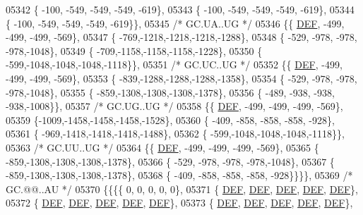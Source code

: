 \begin{DoxyCode}
05342 \{ -100, -549, -549, -549, -619\},
05343 \{ -100, -549, -549, -549, -619\},
05344 \{ -100, -549, -549, -549, -619\}\},
05345 \textcolor{comment}{/* GC.UA..UG */}
05346 \{\{  \mbox{\hyperlink{1_88_84__epars_8h_a397419fc12b37ed479c8abb9d444d843}{DEF}}, -499, -499, -499, -569\},
05347 \{ -769,-1218,-1218,-1218,-1288\},
05348 \{ -529, -978, -978, -978,-1048\},
05349 \{ -709,-1158,-1158,-1158,-1228\},
05350 \{ -599,-1048,-1048,-1048,-1118\}\},
05351 \textcolor{comment}{/* GC.UC..UG */}
05352 \{\{  \mbox{\hyperlink{1_88_84__epars_8h_a397419fc12b37ed479c8abb9d444d843}{DEF}}, -499, -499, -499, -569\},
05353 \{ -839,-1288,-1288,-1288,-1358\},
05354 \{ -529, -978, -978, -978,-1048\},
05355 \{ -859,-1308,-1308,-1308,-1378\},
05356 \{ -489, -938, -938, -938,-1008\}\},
05357 \textcolor{comment}{/* GC.UG..UG */}
05358 \{\{  \mbox{\hyperlink{1_88_84__epars_8h_a397419fc12b37ed479c8abb9d444d843}{DEF}}, -499, -499, -499, -569\},
05359 \{-1009,-1458,-1458,-1458,-1528\},
05360 \{ -409, -858, -858, -858, -928\},
05361 \{ -969,-1418,-1418,-1418,-1488\},
05362 \{ -599,-1048,-1048,-1048,-1118\}\},
05363 \textcolor{comment}{/* GC.UU..UG */}
05364 \{\{  \mbox{\hyperlink{1_88_84__epars_8h_a397419fc12b37ed479c8abb9d444d843}{DEF}}, -499, -499, -499, -569\},
05365 \{ -859,-1308,-1308,-1308,-1378\},
05366 \{ -529, -978, -978, -978,-1048\},
05367 \{ -859,-1308,-1308,-1308,-1378\},
05368 \{ -409, -858, -858, -858, -928\}\}\}\},
05369 \textcolor{comment}{/* GC.@@..AU */}
05370 \{\{\{\{    0,    0,    0,    0,    0\},
05371 \{  \mbox{\hyperlink{1_88_84__epars_8h_a397419fc12b37ed479c8abb9d444d843}{DEF}},  \mbox{\hyperlink{1_88_84__epars_8h_a397419fc12b37ed479c8abb9d444d843}{DEF}},  \mbox{\hyperlink{1_88_84__epars_8h_a397419fc12b37ed479c8abb9d444d843}{DEF}},  \mbox{\hyperlink{1_88_84__epars_8h_a397419fc12b37ed479c8abb9d444d843}{DEF}},  \mbox{\hyperlink{1_88_84__epars_8h_a397419fc12b37ed479c8abb9d444d843}{DEF}}\},
05372 \{  \mbox{\hyperlink{1_88_84__epars_8h_a397419fc12b37ed479c8abb9d444d843}{DEF}},  \mbox{\hyperlink{1_88_84__epars_8h_a397419fc12b37ed479c8abb9d444d843}{DEF}},  \mbox{\hyperlink{1_88_84__epars_8h_a397419fc12b37ed479c8abb9d444d843}{DEF}},  \mbox{\hyperlink{1_88_84__epars_8h_a397419fc12b37ed479c8abb9d444d843}{DEF}},  \mbox{\hyperlink{1_88_84__epars_8h_a397419fc12b37ed479c8abb9d444d843}{DEF}}\},
05373 \{  \mbox{\hyperlink{1_88_84__epars_8h_a397419fc12b37ed479c8abb9d444d843}{DEF}},  \mbox{\hyperlink{1_88_84__epars_8h_a397419fc12b37ed479c8abb9d444d843}{DEF}},  \mbox{\hyperlink{1_88_84__epars_8h_a397419fc12b37ed479c8abb9d444d843}{DEF}},  \mbox{\hyperlink{1_88_84__epars_8h_a397419fc12b37ed479c8abb9d444d843}{DEF}},  \mbox{\hyperlink{1_88_84__epars_8h_a397419fc12b37ed479c8abb9d444d843}{DEF}}\},

\end{DoxyCode}
